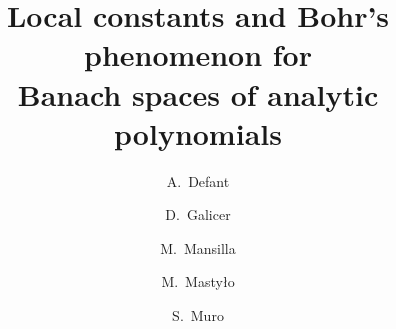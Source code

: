\documentclass[12pt]{amsart}
\numberwithin{subsection}{section}
\theoremstyle{definition}
\theoremstyle{remark}
\begin{document}
\title[Local constants and Bohr's phenomenon for Banach spaces of analytic polynomials]{Local constants and Bohr's phenomenon for \\ Banach spaces of analytic polynomials}
 \author[Defant]{A.~Defant}
 \address{%
 Institut f\"{u}r Mathematik,
 Carl von Ossietzky Universit\"at,
 26111 Oldenburg,
 Germany}


\author[D. Galicer]{D.~Galicer}
\address{Departamento de Matem\'{a}ticas y Estad\'{\i}stica, Universidad T. Di Tella, Av. Figueroa Alcorta 7350 (1428), Buenos Aires, Argentina and IMAS-CONICET.} 



 \author[Mansilla]{M.~Mansilla}
 \address{Departamento de Matem\'{a}tica,
 Facultad de Cs. Exactas y Naturales, Universidad de Buenos Aires and IAM-CONICET. Saavedra 15 (C1083ACA) C.A.B.A., Argentina}



 \author[Masty{\l}o]{M.~Masty{\l}o}
 \address{Faculty of Mathematics and Computer Science, Adam Mickiewicz University, Pozna{\'n}, Uniwersytetu \linebreak
  Pozna{\'n}skiego 4,
 61-614 Pozna{\'n}, Poland}


 \author[Muro]{S.~Muro}
 \address{FCEIA, Universidad Nacional de Rosario and CIFASIS, CONICET, Ocampo $\&$ Esmeralda, S2000 Rosario, Argentina}


\date{}


\end{document}

